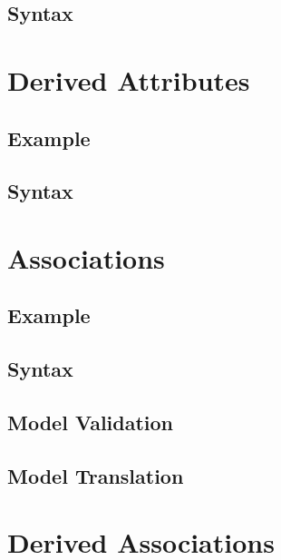 \documentclass[a4paper,oneside,12pt, extrafontsizes]{memoir}
\begin{document}
    \section{Syntax}
    

  \chapter{Derived Attributes}
  \label{ch:derived-attributes}
  

    \section{Example}
    

    \section{Syntax}
    

  \chapter{Associations}
  \label{ch:associations}
  

    \section{Example}
    

    \section{Syntax}
    

    \section{Model Validation}
    

    \section{Model Translation}
    

  \chapter{Derived Associations}
  \label{ch:derived-associations}
  
\end{document}

